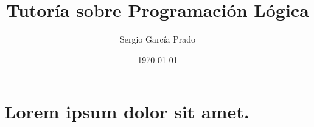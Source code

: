 \documentclass[11pt, a4paper,spanish]{article}
\title{\vspace{-15mm}\fontsize{24pt}{10pt}\selectfont\textbf{Tutoría sobre Programación Lógica}} %
\author{Sergio García Prado}
\date{\today}
\begin{document}
	\maketitle %

	\thispagestyle{fancy} %


	\section{Lorem ipsum dolor sit amet.}
\end{document}
